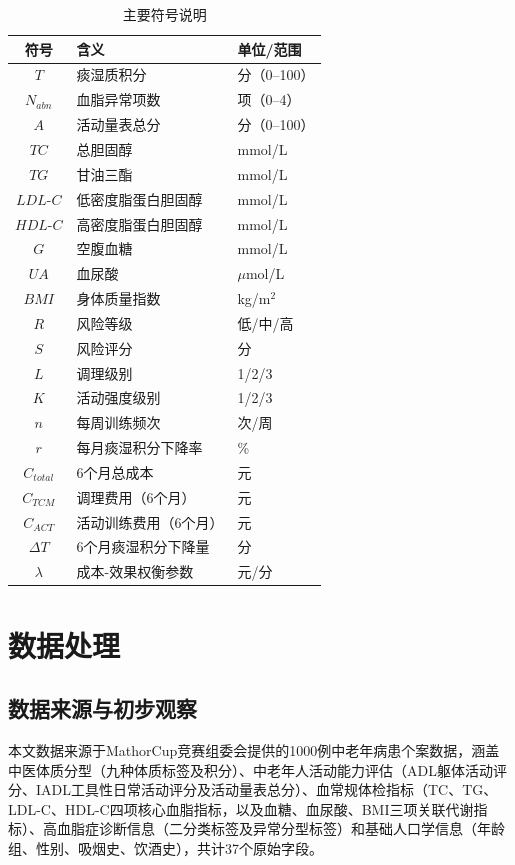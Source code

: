 \documentclass[12pt,a4paper]{ctexart}
\begin{document}
\begin{table}[H]
\centering
\begin{tabular}{cll}
\toprule
\textbf{符号} & \textbf{含义} & \textbf{单位/范围} \\
\midrule
$T$ & 痰湿质积分 & 分（0--100） \\
$N_{abn}$ & 血脂异常项数 & 项（0--4） \\
$A$ & 活动量表总分 & 分（0--100） \\
$TC$ & 总胆固醇 & mmol/L \\
$TG$ & 甘油三酯 & mmol/L \\
$LDL\text{-}C$ & 低密度脂蛋白胆固醇 & mmol/L \\
$HDL\text{-}C$ & 高密度脂蛋白胆固醇 & mmol/L \\
$G$ & 空腹血糖 & mmol/L \\
$UA$ & 血尿酸 & $\mu$mol/L \\
$BMI$ & 身体质量指数 & kg/m$^2$ \\
$R$ & 风险等级 & 低/中/高 \\
$S$ & 风险评分 & 分 \\
$L$ & 调理级别 & 1/2/3 \\
$K$ & 活动强度级别 & 1/2/3 \\
$n$ & 每周训练频次 & 次/周 \\
$r$ & 每月痰湿积分下降率 & \% \\
$C_{total}$ & 6个月总成本 & 元 \\
$C_{TCM}$ & 调理费用（6个月） & 元 \\
$C_{ACT}$ & 活动训练费用（6个月） & 元 \\
$\Delta T$ & 6个月痰湿积分下降量 & 分 \\
$\lambda$ & 成本-效果权衡参数 & 元/分 \\
\bottomrule
\end{tabular}
\caption{主要符号说明}
\end{table}

\section{数据处理}

\subsection{数据来源与初步观察}

本文数据来源于MathorCup竞赛组委会提供的1000例中老年病患个案数据，涵盖中医体质分型（九种体质标签及积分）、中老年人活动能力评估（ADL躯体活动评分、IADL工具性日常活动评分及活动量表总分）、血常规体检指标（TC、TG、LDL-C、HDL-C四项核心血脂指标，以及血糖、血尿酸、BMI三项关联代谢指标）、高血脂症诊断信息（二分类标签及异常分型标签）和基础人口学信息（年龄组、性别、吸烟史、饮酒史），共计37个原始字段。
\end{document}
